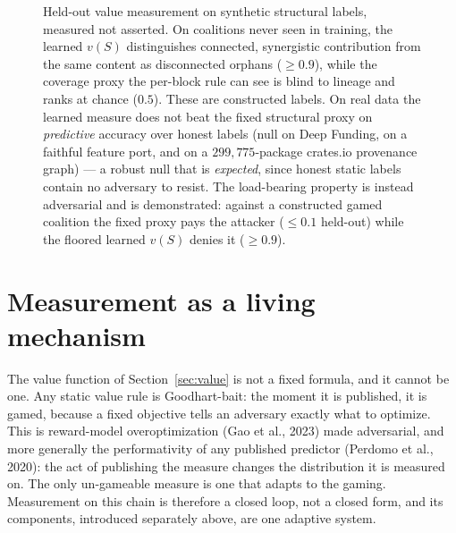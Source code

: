 \documentclass[10pt]{article}
\begin{document}
\begin{figure}[h]
\centering
{}
\caption{Held-out value measurement on synthetic structural labels, measured not asserted. On
coalitions never seen in training, the learned $v(S)$ distinguishes connected, synergistic contribution
from the same content as disconnected orphans ($\ge 0.9$), while the coverage proxy the per-block rule
can see is blind to lineage and ranks at chance ($0.5$). These are constructed labels. On real data the
learned measure does not beat the fixed structural proxy on \emph{predictive} accuracy over honest
labels (null on Deep Funding, on a faithful feature port, and on a $299{,}775$-package crates.io
provenance graph) --- a robust null that is \emph{expected}, since honest static labels contain no
adversary to resist. The load-bearing property is instead adversarial and is demonstrated: against a
constructed gamed coalition the fixed proxy pays the attacker ($\le 0.1$ held-out) while the floored
learned $v(S)$ denies it ($\ge 0.9$).}
\label{fig:moat}
\end{figure}

\section{Measurement as a living mechanism}\label{sec:living}

The value function of Section~\ref{sec:value} is not a fixed formula, and it cannot be one. Any static
value rule is Goodhart-bait: the moment it is published, it is gamed, because a fixed objective tells an
adversary exactly what to optimize. This is reward-model overoptimization (Gao et al., 2023) made
adversarial, and more generally the performativity of any published predictor (Perdomo et al., 2020):
the act of publishing the measure changes the distribution it is measured on. The only un-gameable measure is one that adapts to the gaming.
Measurement on this chain is therefore a closed loop, not a closed form, and its components, introduced
separately above, are one adaptive system.
\end{document}
